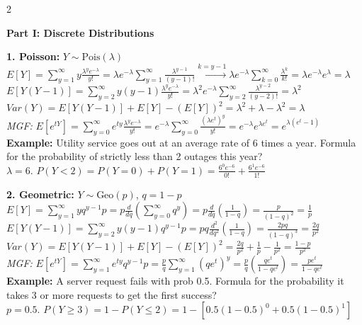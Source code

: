 \documentclass[10pt]{article}
\begin{document}
\begin{multicols*}{2}

\textbf{\Large Part I: Discrete Distributions}

\textbf{1. Poisson:} $Y \sim \text{Pois}(\lambda)$\\
$E[Y] = \sum_{y=1}^{\infty} y \frac{\lambda^y e^{-\lambda}}{y!} = \lambda e^{-\lambda} \sum_{y=1}^{\infty} \frac{\lambda^{y-1}}{(y-1)!} \xrightarrow{k=y-1} \lambda e^{-\lambda} \sum_{k=0}^{\infty} \frac{\lambda^k}{k!} = \lambda e^{-\lambda} e^\lambda = \lambda$\\
$E[Y(Y-1)] = \sum_{y=2}^{\infty} y(y-1) \frac{\lambda^y e^{-\lambda}}{y!} = \lambda^2 e^{-\lambda} \sum_{y=2}^{\infty} \frac{\lambda^{y-2}}{(y-2)!} = \lambda^2$\\
$Var(Y) = E[Y(Y-1)] + E[Y] - (E[Y])^2 = \lambda^2 + \lambda - \lambda^2 = \lambda$\\
\textit{MGF:} $E[e^{tY}] = \sum_{y=0}^{\infty} e^{ty} \frac{\lambda^y e^{-\lambda}}{y!} = e^{-\lambda} \sum_{y=0}^{\infty} \frac{(\lambda e^t)^y}{y!} = e^{-\lambda} e^{\lambda e^t} = e^{\lambda(e^t - 1)}$\\
\textbf{Example:} Utility service goes out at an average rate of 6 times a year. Formula for the probability of strictly less than 2 outages this year? \\
$\lambda = 6$. $P(Y < 2) = P(Y=0) + P(Y=1) = \frac{6^0 e^{-6}}{0!} + \frac{6^1 e^{-6}}{1!}$

\vspace{2mm}
\textbf{2. Geometric:} $Y \sim \text{Geo}(p)$, $q = 1-p$\\
$E[Y] = \sum_{y=1}^{\infty} y q^{y-1} p = p \frac{d}{dq} \left(\sum_{y=0}^{\infty} q^y\right) = p \frac{d}{dq} \left(\frac{1}{1-q}\right) = \frac{p}{(1-q)^2} = \frac{1}{p}$\\
$E[Y(Y-1)] = \sum_{y=2}^{\infty} y(y-1) q^{y-1} p = pq \frac{d^2}{dq^2} \left(\frac{1}{1-q}\right) = \frac{2pq}{(1-q)^3} = \frac{2q}{p^2}$\\
$Var(Y) = E[Y(Y-1)] + E[Y] - (E[Y])^2 = \frac{2q}{p^2} + \frac{1}{p} - \frac{1}{p^2} = \frac{1-p}{p^2}$\\
\textit{MGF:} $E[e^{tY}] = \sum_{y=1}^{\infty} e^{ty} q^{y-1} p = \frac{p}{q} \sum_{y=1}^{\infty} (qe^t)^y = \frac{p}{q} \left(\frac{qe^t}{1-qe^t}\right) = \frac{pe^t}{1-qe^t}$\\
\textbf{Example:} A server request fails with prob 0.5. Formula for the probability it takes 3 or more requests to get the first success?\\
$p = 0.5$. $P(Y \ge 3) = 1 - P(Y \le 2) = 1 - [0.5(1-0.5)^0 + 0.5(1-0.5)^1]$


\end{multicols*}
\end{document}
